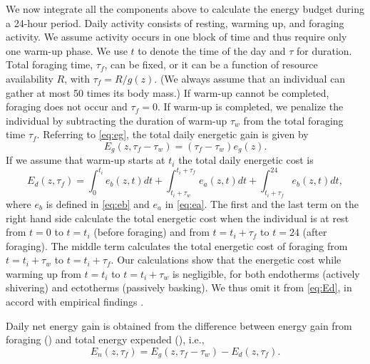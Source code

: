 We now integrate all the components above to calculate the energy budget during a 24-hour period.
Daily activity consists of resting, warming up, and foraging activity.
We assume activity occurs in one block of time and thus require only one warm-up phase. %
We use $t$ to denote the time of the day and $\tau$ for duration.
Total foraging time, $\tau_f$, can be fixed, or it can be a function of resource availability $R$, with $\tau_f = R/g(z)$.
(We always assume that an individual can gather at most 50 times its body mass.)
If warm-up cannot be completed, foraging does not occur and $\tau_f = 0$.
If warm-up is completed, we penalize the individual by subtracting the duration of warm-up $\tau_w$ from the total foraging time $\tau_f$.
Referring to \cref{eq:eg}, the total daily energetic gain is given by
\begin{equation} \label{eq:Eg}
	E_g(z,\tau_f - \tau_w) = (\tau_f - \tau_w) e_g(z).
\end{equation}
If we assume that warm-up starts at $t_i$ the total daily energetic cost is
\begin{equation} \label{eq:Ed}
	E_d(z, \tau_f) = \int_0^{t_i} e_b(z, t) dt + \int_{t_i + \tau_w}^{t_i + \tau_f } e_a(z,t) dt + \int_{t_i+\tau_f}^{24} e_b(z, t) dt,
\end{equation}
where $e_b$ is defined in \cref{eq:eb}  and $e_a$ in \cref{eq:ea}.
The first and the last term on the right hand side calculate the total energetic cost when the individual is at rest from $t = 0$ to $t = t_i$ (before foraging) and from $t = t_i + \tau_f$ to $t = 24$ (after foraging).
The middle term calculates the total energetic cost of foraging from $t = t_i + \tau_w$ to $t = t_i + \tau_f$.
Our calculations show that the energetic cost while warming up from $t = t_i$ to $t = t_i + \tau_w$ is negligible, for both endotherms (actively shivering) and ectotherms (passively basking).
We thus omit it from \cref{eq:Ed}, in accord with empirical findings \citep{Heinrich1975}.

Daily net energy gain is obtained from the difference between energy gain from foraging () and total energy expended (), i.e.,
\[
	E_n(z, \tau_f) = E_g(z,\tau_f- \tau_w) - E_d(z, \tau_f).
\]

